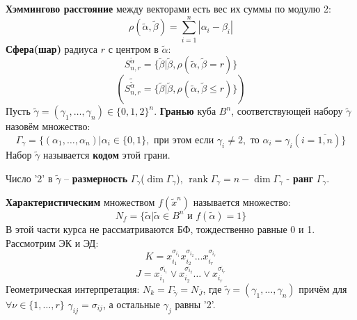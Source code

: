 \documentclass[11pt]{article}
\begin{document}
\textbf{Хэммингово расстояние} между векторами есть вес их суммы по модулю 2:
\begin{equation*}
\rho(\tilde{\alpha}, \tilde{\beta}) = \sum_{i = 1}^n|\alpha_i - \beta_i|
\end{equation*}
\textbf{Сфера(шар)} радиуса \(r\) с центром в \(\tilde{\alpha}\):
\begin{equation*}
S_{n, r}^{\tilde{\alpha}} = \{\tilde{\beta} | \tilde{\beta}, \rho(\tilde{\alpha}, \tilde{\beta} = r)\}
\end{equation*}
\begin{equation*}
(\tilde{S_{n, r}^{\tilde{\alpha}}} = \{\tilde{\beta} | \tilde{\beta}, \rho(\tilde{\alpha}, \tilde{\beta} \leq r)\})
\end{equation*}
Пусть \(\tilde{\gamma} = (\gamma_1, \ldots, \gamma_n) \in \{0, 1, 2\}^n\). \textbf{Гранью} куба \(B^n\),
соответствующей набору \(\tilde{\gamma}\) назовём множество:
\begin{equation*}
\Gamma_{\gamma} = \{(\alpha_1, \ldots, \alpha_n) | \alpha_i \in \{0, 1\},
\text{ при этом если }\gamma_i \neq 2, \text{ то } \alpha_i = \gamma_i(i = \overline{1, n})\}
\end{equation*}
Набор \(\tilde{\gamma}\) называется \textbf{кодом} этой грани.

Число '2' в \(\tilde{\gamma}\) -- \textbf{размерность} \(\Gamma_{\gamma}\)(\(\dim \Gamma_{\gamma}\)),
\(\operatorname{rank}\Gamma_{\gamma} = n - \dim\Gamma_{\gamma}\) - \textbf{ранг} \(\Gamma_{\gamma}\).

\textbf{Характеристическим} множеством \(f(\tilde{x}^n)\) называется множество:
\begin{equation*}
N_f = \{\tilde{\alpha} | \tilde{\alpha} \in B^n\text{ и }f(\tilde{\alpha}) = 1\}
\end{equation*}
В этой части курса не рассматриваются БФ, тождественно равные 0 и 1. Рассмотрим ЭК и ЭД:
\begin{equation*}
K = x_{i_1}^{\sigma_{i_1}}x_{i_2}^{\sigma_{i_2}}\ldots x_{i_r}^{\sigma_{i_r}}
\end{equation*}
\begin{equation*}
J = x_{i_1}^{\overline{\sigma_{i_1}}}\vee x_{i_2}^{\overline{\sigma_{i_2}}}\ldots\vee x_{i_r}^{\overline{\sigma_{i_r}}}
\end{equation*}
Геометрическая интерпретация: \(N_k = \Gamma_{\tilde{\gamma}} = N_{\overline{J}}\),
где \(\tilde{\gamma} = (\gamma_1, \ldots, \gamma_n)\) причём для \(\forall \nu \in \{1, \ldots, r\}\)
\(\gamma_{ij} = \sigma_{ij}\), а остальные \(\gamma_j\) равны '2'.
\end{document}
